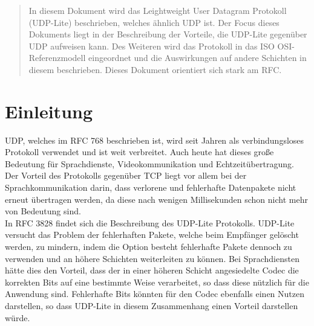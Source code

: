 \documentclass{template}
\begin{document}
\maketitle
\begin{abstract}
In diesem Dokument wird das Leightweight User Datagram Protokoll (UDP-Lite) beschrieben,
welches ähnlich UDP ist. Der Focus dieses Dokuments liegt in der Beschreibung der Vorteile,
die UDP-Lite gegenüber UDP aufweisen kann. Des Weiteren wird das Protokoll in das
ISO OSI-Referenzmodell eingeordnet und die Auswirkungen auf andere Schichten in diesem beschrieben.
Dieses Dokument orientiert sich stark am RFC.

\end{abstract}




\section{Einleitung}

UDP, welches im RFC 768 beschrieben ist, wird seit Jahren als verbindungsloses Protokoll verwendet
und ist weit verbreitet. Auch heute hat dieses große Bedeutung für Sprachdienste,
Videokommunikation und Echtzeitübertragung. Der Vorteil des Protokolls gegenüber TCP
liegt vor allem bei der Sprachkommunikation darin, dass verlorene und fehlerhafte Datenpakete
nicht erneut übertragen werden, da diese nach wenigen Millisekunden schon nicht mehr von Bedeutung sind.\\

In RFC 3828 findet sich die Beschreibung des UDP-Lite Protokolls.
UDP-Lite versucht das Problem der fehlerhaften Pakete, welche beim Empfänger gelöscht werden,
zu mindern, indem die Option besteht fehlerhafte Pakete dennoch zu verwenden
und an höhere Schichten weiterleiten zu können. Bei Sprachdiensten hätte dies den Vorteil,
dass der in einer höheren Schicht angesiedelte Codec die korrekten Bits
auf eine bestimmte Weise verarbeitet, so dass diese nützlich für die Anwendung sind.
Fehlerhafte Bits könnten für den Codec ebenfalls einen Nutzen darstellen,
so dass UDP-Lite in diesem Zusammenhang einen Vorteil darstellen würde.
\end{document}
